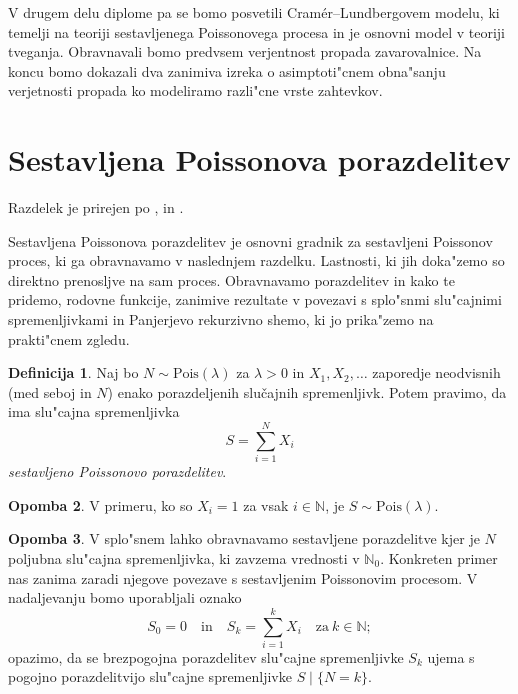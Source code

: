 \documentclass[12pt, a4paper, reqno]{amsart}
\theoremstyle{definition}
\newtheorem{definicija}{Definicija}[section]
\newtheorem{opomba}[definicija]{Opomba}
\theoremstyle{plain}
\newcommand{\N}{\mathbb{N}}
\newcommand{\1}{\mathds{1}}
\newcommand{\Pois}[1]{\text{Pois}(#1)}
\begin{document}
    V drugem delu diplome pa se bomo posvetili Cramér--Lundbergovem modelu, ki temelji na teoriji
    sestavljenega Poissonovega procesa in je
    osnovni model v teoriji tveganja. Obravnavali bomo predvsem verjentnost propada zavarovalnice. Na koncu 
    bomo dokazali dva zanimiva izreka o asimptoti"cnem obna"sanju verjetnosti propada ko modeliramo 
    razli"cne vrste zahtevkov. 
    

\section{Sestavljena Poissonova porazdelitev}

    \noindent
    Razdelek je prirejen po \cite{1}, \cite{2} in \cite{4}.

    Sestavljena Poissonova porazdelitev je osnovni gradnik za sestavljeni Poissonov proces, ki ga obravnavamo 
    v naslednjem razdelku. Lastnosti, ki jih doka"zemo so direktno prenosljve na sam proces. Obravnavamo 
    porazdelitev in kako te pridemo, rodovne funkcije, zanimive rezultate v povezavi s 
    splo"snmi slu"cajnimi spremenljivkami in Panjerjevo rekurzivno shemo, ki jo prika"zemo na 
    prakti"cnem zgledu.

    \begin{definicija}
        Naj bo $N\sim \Pois{\lambda}$  za $\lambda >0$ in $X_1, X_2, \dots$ zaporedje neodvisnih (med seboj in $N$)
        enako porazdeljenih slučajnih spremenljivk. Potem pravimo, da ima slu"cajna spremenljivka
        \begin{equation*}
            S = \sum_{i=1}^NX_i
        \end{equation*}
        \textit{sestavljeno Poissonovo porazdelitev}. 
        \label{def:sestavljenaPoissonovaPorazdelitev}
    \end{definicija}

    \begin{opomba}
        V primeru, ko so $X_i = 1$ za vsak $i\in\N$, je $S\sim\Pois{\lambda}$.
    \end{opomba}

    \begin{opomba}
        V splo"snem lahko obravnavamo sestavljene porazdelitve kjer je $N$ poljubna slu"cajna spremenljivka,
        ki zavzema vrednosti v $\N_0$. Konkreten primer nas zanima zaradi njegove povezave s sestavljenim
        Poissonovim procesom. V nadaljevanju bomo uporabljali oznako
        \begin{equation*}
            S_0 = 0 \quad \text{in} \quad S_k = \sum_{i=1}^kX_i \quad \text{za} \ k\in\N; 
        \end{equation*}
        opazimo, da se brezpogojna porazdelitev slu"cajne spremenljivke $S_k$ ujema s pogojno porazdelitvijo 
        slu"cajne spremenljivke $S\mid\{N = k\}$.
        \label{op:gneralCaseCOmpound}
    \end{opomba}
\end{document}
